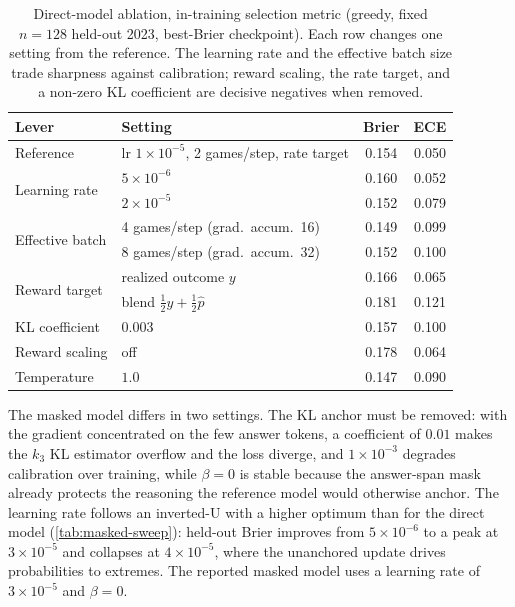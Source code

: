 \begin{table}[h]
\centering
\small
\begin{tabular}{llcc}
\toprule
Lever & Setting & Brier & ECE \\
\midrule
Reference & lr $1{\times}10^{-5}$, 2 games/step, rate target & 0.154 & 0.050 \\
\midrule
\multirow{2}{*}{Learning rate} & $5\times10^{-6}$ & 0.160 & 0.052 \\
                               & $2\times10^{-5}$ & 0.152 & 0.079 \\
\midrule
\multirow{2}{*}{Effective batch} & 4 games/step (grad.\ accum.\ 16) & 0.149 & 0.099 \\
                                 & 8 games/step (grad.\ accum.\ 32) & 0.152 & 0.100 \\
\midrule
\multirow{2}{*}{Reward target} & realized outcome $y$ & 0.166 & 0.065 \\
                               & blend $\tfrac12 y + \tfrac12\hat p$ & 0.181 & 0.121 \\
\midrule
KL coefficient & $0.003$ & 0.157 & 0.100 \\
Reward scaling & off & 0.178 & 0.064 \\
Temperature & $1.0$ & 0.147 & 0.090 \\
\bottomrule
\end{tabular}
\caption{Direct-model ablation, in-training selection metric (greedy, fixed $n=128$ held-out 2023,
best-Brier checkpoint). Each row changes one setting from the reference. The learning rate and the
effective batch size trade sharpness against calibration; reward scaling, the rate target, and a
non-zero KL coefficient are decisive negatives when removed.}
\label{tab:direct-sweep}
\end{table}

The masked model differs in two settings. The KL anchor must be removed: with the gradient
concentrated on the few answer tokens, a coefficient of $0.01$ makes the $k_3$ KL estimator overflow
and the loss diverge, and $1\times10^{-3}$ degrades calibration over training, while $\beta=0$ is
stable because the answer-span mask already protects the reasoning the reference model would
otherwise anchor. The learning rate follows an inverted-U with a higher optimum than for the direct
model (\cref{tab:masked-sweep}): held-out Brier improves from $5\times10^{-6}$ to a peak at
$3\times10^{-5}$ and collapses at $4\times10^{-5}$, where the unanchored update drives probabilities
to extremes. The reported masked model uses a learning rate of $3\times10^{-5}$ and $\beta=0$.

